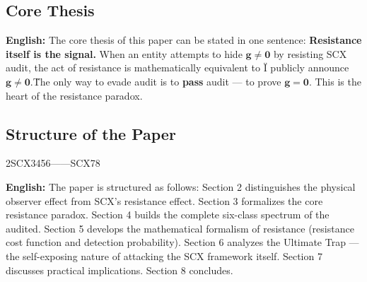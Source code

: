 \documentclass[12pt,a4paper]{article}
\theoremstyle{remark}
\newcommand{\g}{\mathbf{g}}
\begin{document}
\subsection{}
\subsection{Core Thesis}



\vspace{6pt}
\begin{center}
\fbox{\parbox{0.9\textwidth}{
\centering
\textbf{} SCX $ \g \neq \mathbf{0} $ \" $ \g \neq \mathbf{0} $\"\textbf{}—— $ \g = \mathbf{0} $
}}
\end{center}
\vspace{6pt}

\noindent
\textbf{English:} The core thesis of this paper can be stated in one sentence: \textbf{Resistance itself is the signal.} When an entity attempts to hide $ \g \neq \mathbf{0} $ by resisting SCX audit, the act of resistance is mathematically equivalent to \"I publicly announce $ \g \neq \mathbf{0} $.\" The only way to evade audit is to \textbf{pass} audit — to prove $ \g = \mathbf{0} $. This is the heart of the resistance paradox.

\subsection{}
\subsection{Structure of the Paper}

2SCX3456——SCX78

\vspace{4pt}
\noindent
\textbf{English:} The paper is structured as follows: Section 2 distinguishes the physical observer effect from SCX's resistance effect. Section 3 formalizes the core resistance paradox. Section 4 builds the complete six-class spectrum of the audited. Section 5 develops the mathematical formalism of resistance (resistance cost function and detection probability). Section 6 analyzes the Ultimate Trap — the self-exposing nature of attacking the SCX framework itself. Section 7 discusses practical implications. Section 8 concludes.

\end{document}
